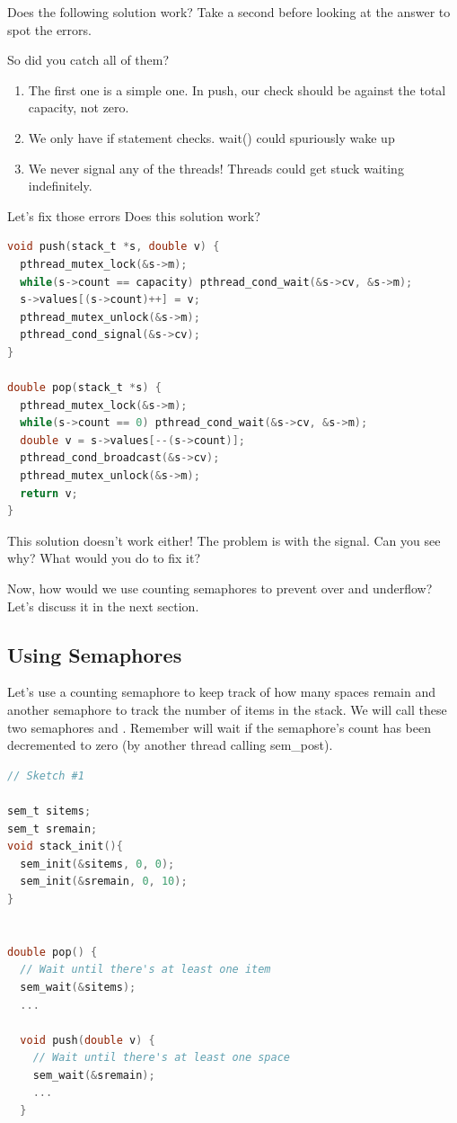 Does the following solution work?
Take a second before looking at the answer to spot the errors.

So did you catch all of them?
\begin{enumerate}
\item The first one is a simple one. In push, our check should be against the total capacity, not zero.
\item We only have if statement checks. wait() could spuriously wake up
\item We never signal any of the threads! Threads could get stuck waiting indefinitely.
\end{enumerate}

Let's fix those errors
Does this solution work?

\begin{lstlisting}[language=C]
void push(stack_t *s, double v) {
  pthread_mutex_lock(&s->m);
  while(s->count == capacity) pthread_cond_wait(&s->cv, &s->m);
  s->values[(s->count)++] = v;
  pthread_mutex_unlock(&s->m);
  pthread_cond_signal(&s->cv);
}

double pop(stack_t *s) {
  pthread_mutex_lock(&s->m);
  while(s->count == 0) pthread_cond_wait(&s->cv, &s->m);
  double v = s->values[--(s->count)];
  pthread_cond_broadcast(&s->cv);
  pthread_mutex_unlock(&s->m);
  return v;
}
\end{lstlisting}

This solution doesn't work either!
The problem is with the signal.
Can you see why? What would you do to fix it?

Now, how would we use counting semaphores to prevent over and underflow?
Let's discuss it in the next section.

\subsection{Using Semaphores}

Let's use a counting semaphore to keep track of how many spaces remain and another semaphore to track the number of items in the stack.
We will call these two semaphores  and .
Remember  will wait if the semaphore's count has been decremented to zero (by another thread calling sem\_post).

\begin{lstlisting}[language=C]
// Sketch #1

sem_t sitems;
sem_t sremain;
void stack_init(){
  sem_init(&sitems, 0, 0);
  sem_init(&sremain, 0, 10);
}


double pop() {
  // Wait until there's at least one item
  sem_wait(&sitems);
  ...

  void push(double v) {
    // Wait until there's at least one space
    sem_wait(&sremain);
    ...
  }
\end{lstlisting}

